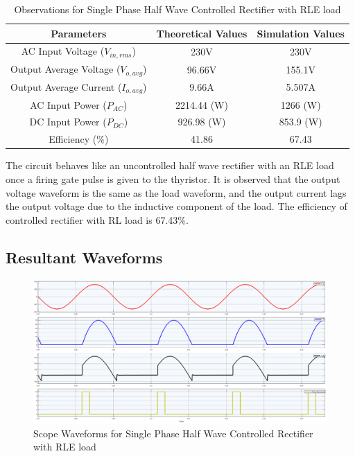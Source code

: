 \begin{table}[h]
    \renewcommand{\arraystretch}{1.3}
    \label{table_observation_7}
    \centering
    \begin{tabular}{|c|c|c|}
        \hline
        Parameters                              & Theoretical Values & Simulation Values \\
        \hline
        \hline
        AC Input Voltage ($ V_{in,rms} $)       & 230V               & 230V              \\
        \hline
        Output Average Voltage ($ V_{o,avg} $)  & 96.66V             & 155.1V            \\
        \hline
        Output Average Current ($ I_{o,avg}  $) & 9.66A              & 5.507A            \\
        \hline
        AC Input Power ($ P_{AC}  $)            & 2214.44 (W)        & 1266 (W)          \\
        \hline
        DC Input Power ($ P_{DC}  $)            & 926.98 (W)         & 853.9 (W)         \\
        \hline
        Efficiency (\%)                         & 41.86              & 67.43             \\
        \hline
    \end{tabular}
    \caption{Observations for Single Phase Half Wave Controlled Rectifier with RLE load}

\end{table}


The circuit behaves like an uncontrolled half wave rectifier with an RLE load once a firing gate pulse is given to the thyristor. It is observed that the output voltage waveform is the same as the load waveform, and the output current lags the output voltage due to the inductive component of the load.
The efficiency of controlled rectifier
with RL load is 67.43\%.





\subsection{Resultant Waveforms}

\begin{figure}[h]
    \centering
    \includegraphics[width=1\textwidth]{images/experiment-1/circuit-scope-simulation-07.png}
    \caption{Scope Waveforms for Single Phase Half Wave Controlled Rectifier with RLE load}
    \label{Fig_waveform_single-phase-half-wave-controlled-rectifier-with-RLE-load}
\end{figure}


\pagebreak

